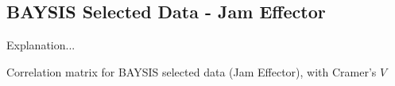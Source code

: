 \begin{appendices}
    
    \tocless\section{BAYSIS Selected Data - Jam Effector}
    \label{appendix_baysis_selected_duringJam}
    
    Explanation...
    
    
    
    \begin{table}
    	\tiny
    	\setlength{\tabcolsep}{2pt}
    	\centering
    	
    	\caption{Correlation matrix for BAYSIS selected data (Jam Effector), with Cramer's $V$}
    	\label{table:appendix_correlation_matrix_selected_startJam_cramers}
    \end{table}
    

\end{appendices}
